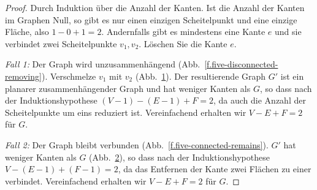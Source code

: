 \begin{proof}
Durch Induktion über die Anzahl der Kanten. Ist die Anzahl der Kanten im Graphen Null, so gibt es nur einen einzigen Scheitelpunkt und eine einzige Fläche, also $1-0+1=2$. Andernfalls gibt es mindestens eine Kante $e$ und sie verbindet zwei Scheitelpunkte $v_1,v_2$. Löschen Sie die Kante $e$.

\textit{Fall 1:}
Der Graph wird unzusammenhängend (Abb.~\ref{f.five-disconnected-removing}). Verschmelze $v_1$ mit $v_2$ (Abb.~\ref{f.five-disconnected-merge}). Der resultierende Graph $G'$ ist ein planarer zusammenhängender Graph und hat weniger Kanten als $G$, so dass nach der Induktionshypothese $(V-1)-(E-1)+F=2$, da auch die Anzahl der Scheitelpunkte um eins reduziert ist. Vereinfachend erhalten wir $V-E+F=2$ für $G$.
\begin{figure}[ht]
\subfigures
{}
\hfill
{}
\label{f.five-disconnected-removing}
\label{f.five-disconnected-merge}
\end{figure}

\textit{Fall 2:}
Der Graph bleibt verbunden (Abb.~\ref{f.five-connected-remains}). $G'$ hat weniger Kanten als $G$ (Abb.~\ref{f.five-connected-fewer}), so dass nach der Induktionshypothese $V-(E-1)+(F-1)=2$, da das Entfernen der Kante zwei Flächen zu einer verbindet. Vereinfachend erhalten wir $V-E+F=2$ für $G$.
\end{proof}

\begin{figure}[ht]
\subfigures
{}
\hfill
{}
\label{f.five-connected-remains}
\label{f.five-connected-fewer}
\end{figure}

